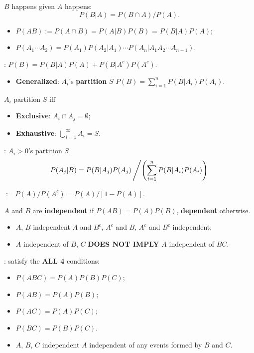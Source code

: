  \(B\) happens given \(A\) happens:
\[P(B|A) = {P(B\cap A)}/{P(A)}.\]
\begin{itemize}
  \item \(P(AB) := P(A\cap B) = P(A|B)P(B)\) = \(P(B|A)P(A)\);
  \item \(P(A_1\cdots A_2)=P(A_1)P(A_2|A_1)\cdots
    P(A_n|A_1A_2\cdots A_{n-1})\).
\end{itemize}

: \(P(B) = P(B|A)P(A) + P(B|A^c)P(A^c)\).
\begin{itemize}
  \item \textbf{Generalized}: \(A_i\)'s \textbf{partition} \(S\) \tf
    \(P(B) = \sum\limits_{i=1}^{n}P(B|A_i)P(A_i)\).
\end{itemize}
 \(A_i\) partition \(S\) iff
\begin{multicols}{2}
\begin{itemize}
  \item \textbf{Exclusive}: \(A_i\cap A_j = \emptyset\);
  \item \textbf{Exhaustive}: \(\bigcup\limits_{i=1}^{\infty}A_i =S\).
\end{itemize}
\end{multicols}

: \(A_i > 0\)'s partition \(S\) \tf 
\[P(A_j|B) =
{P(B|A_j)P(A_j)}\left/\left({\sum\limits_{i=1}^{n}P(B|A_i)P(A_i)}\right)\right.\]

 \(:=P(A) / P(A^c) = P(A) / [1-P(A)]\).

 \(A\) and \(B\) are \textbf{independent} if
\(P(AB) = P(A)P(B)\), \textbf{dependent} otherwise.
\begin{itemize}
  \item \(A\), \(B\) independent \tf \(A\) and \(B^c\), \(A^c\) and \(B\),
    \(A^c\) and \(B^c\) independent;
  \item \(A\) independent of \(B\), \(C\) \textbf{DOES NOT IMPLY} \(A\)
    independent of \(BC\).
\end{itemize}

: satisfy the \textbf{ALL 4} conditions: 
\begin{multicols}{2}
\begin{itemize}
  \item \(P(ABC) = P(A)P(B)P(C)\);
  \item \(P(AB) = P(A)P(B)\);
  \item \(P(AC) = P(A)P(C)\);
  \item \(P(BC) = P(B)P(C)\).
\end{itemize}
\end{multicols}
\begin{itemize}
  \item \(A\), \(B\), \(C\) independent \tf \(A\) independent of any events
    formed by \(B\) and \(C\).
\end{itemize}

